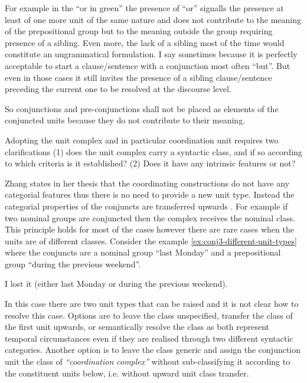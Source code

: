 For example in the ``or in green'' the presence of ``or'' signalls the presence at least of one more unit of the same nature and does not contribute to the meaning of the prepositional group but to the meaning outside the group requiring presence of a sibling. Even more, the lack of a sibling most of the time would constitute an ungrammatical formulation. I say sometimes because it is perfectly acceptable to start a clause/sentence with a conjunction most often ``but''. But even in those cases it still invites the presence of a sibling clause/sentence preceding the current one to be resolved at the discourse level. 

So conjunctions and pre-conjunctions shall not be placed as elements of the conjuncted units because they do not contribute to their meaning.

Adopting the unit complex and in particular coordination unit requires two clarifications (1) does the unit complex carry a syntactic class, and if so according to which criteria is it established? (2) Does it have any intrinsic features or not?

Zhang states in her thesis that the coordinating constructions do not have any categorial features thus there is no need to provide a new unit type. Instead the categorial properties of the conjuncts are transferred upwards \citep{NinaZhang2010}. For example if two nominal groups are conjuncted then the complex receives the nominal class. This principle holds for most of the cases however there are rare cases when the units are of different classes. Consider the example \ref{ex:conj3-different-unit-types} where the conjuncts are a nominal group ``last Monday'' and a prepositional group ``during the previous weekend''.
\begin{exe}
	\ex\label{ex:conj3-different-unit-types}
	I lost it (either last Monday or during the previous weekend). 
\end{exe}

In this case there are two unit types that can be raised and it is not clear how to resolve this case. Options are to leave the class unspecified, transfer the class of the first unit upwards, or semantically resolve the class as both represent temporal circumstances even if they are realised through two different syntactic categories. Another option is to leave the class generic and assign the conjunction unit the class of \textit{``coordination complex''} without sub-classifying it according to the constituent units below, i.e. without upward unit class transfer. 

